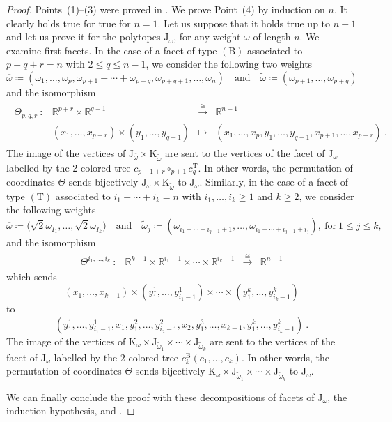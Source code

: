 \documentclass[twoside, 12pt]{amsart}
\theoremstyle{remark}
\newcommand{\RR}{\mathbb{R}}
\newcommand{\K}{\mathrm{K}}
\newcommand{\J}{\mathrm{J}}
\newcommand{\B}{\mathrm{B}}
\newcommand{\T}{\mathrm{T}}
\begin{document}
\begin{proof}

Points~(1)--(3) were proved in \cite{Forcey08}.  
We prove Point~(4) by induction on $n$. 
It clearly holds true for true for $n=1$. Let us suppose that it holds true up to $n-1$ and let us prove it for the polytopes $\J_\omega$, for any weight $\omega$ of length $n$.
We examine first facets. 
In the case of a facet of type $(\B)$ associated to $p+q+r=n$ with $2\leq q \leq n-1$, we consider the following two weights 
\[
\overline{\omega}\coloneqq (\omega_1, \ldots, \omega_{p}, \omega_{p+1}+\cdots+\omega_{p+q}, \omega_{p+q+1}, \ldots,  \omega_{n})
\quad \text{and} \quad 
\widetilde{\omega}\coloneqq (\omega_{p+1}, \ldots, \omega_{p+q})
\]
and the isomorphism 
\begin{align*}
\begin{array}{rccc}
\Theta_{p,q,r}\  : &  \RR^{p+r}\times \RR^{q-1} &\xrightarrow{\cong} &\RR^{n-1}\\
&(x_1, \ldots, x_{p+r})\times (y_1, \ldots, y_{q-1}) & \mapsto& 
(x_1, \ldots, x_{p} , y_1, \ldots, y_{q-1}, x_{p+1}, \ldots, x_{p+r})\ .
\end{array}
\end{align*}
The image of the vertices of $\J_{\overline{\omega}}\times \K_{\widetilde{\omega}}$ are sent to the vertices of the facet of $\J_\omega$
labelled by the 2-colored tree $c_{p+1+r}\circ_{p+1} c^\T_q$. 
In other words, the permutation of coordinates $\Theta$ sends bijectively $\J_{\overline{\omega}}\times \K_{\widetilde{\omega}}$ to $\J_\omega$. 
Similarly, in the case of a facet of type $(\T)$ associated to $i_1+\cdots+i_k=n$ with 
$i_1, \ldots,i_k\geq 1$ and $k\geq 2$, 
 we consider the following weights 
%
\[
\overline{\omega}\coloneqq \big(\sqrt{2}\omega_{I_1}, \ldots, \sqrt{2}\omega_{I_k}\big)
\quad \text{and} \quad 
\widetilde{\omega}_j\coloneqq (\omega_{i_1+\cdots+i_{j-1}+1}, \ldots, \omega_{i_1+\cdots+i_{j-1}+i_j}), \ \text{for}\ 1\leq j\leq k, 
\]
and the isomorphism 
\begin{align*}
\begin{array}{rccc}
\Theta^{i_1, \ldots, i_k}\  : &  \RR^{k-1}\times \RR^{i_1-1}\times \cdots \times \RR^{i_k-1} &\xrightarrow{\cong} &\RR^{n-1}
\end{array}
\end{align*}
which sends 
\[(x_1, \ldots, x_{k-1})\times (y_1^1, \ldots, y^1_{i_1-1})\times \cdots 
\times (y_1^k, \ldots, y^k_{i_k-1})\]
to 
\[(
y^1_1,\ldots, y^1_{i_1-1}, x_1, y^2_1, \ldots, y^2_{i_2-1}, x_2, y^3_1, \ldots, x_{k-1}, y^k_1, \ldots, y^k_{i_k-1}
)\ .\]
The image of the vertices of 
$\K_{\overline{\omega}}\times \J_{\widetilde{\omega}_1}\times \cdots \times \J_{\widetilde{\omega}_k}$ are sent to the vertices of the facet of $\J_\omega$
labelled by the 2-colored tree $c^\B_k(c_1, \ldots, c_k)$. In other words, the permutation of coordinates $\Theta$ sends bijectively $\K_{\overline{\omega}}\times \J_{\widetilde{\omega}_1}\times \cdots \times \J_{\widetilde{\omega}_k}$ to $\J_\omega$. 

We can finally conclude the proof with these decompositions of facets of $\J_\omega$, the induction hypothesis, and \cite[Proposition~1, Point~(5)]{MTTV19}.
\end{proof}
\end{document}
